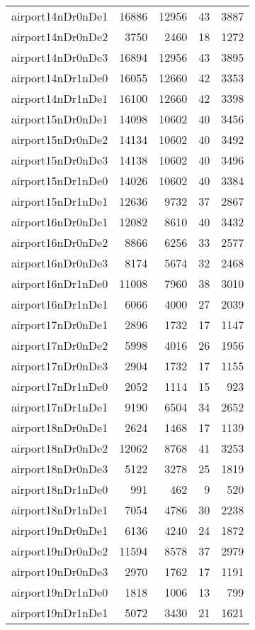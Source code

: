 \begin{longtable}{lrrrr}
airport14nDr0nDe1 & 16886 & 12956 & 43 & 3887 \\
airport14nDr0nDe2 & 3750 & 2460 & 18 & 1272 \\
airport14nDr0nDe3 & 16894 & 12956 & 43 & 3895 \\
airport14nDr1nDe0 & 16055 & 12660 & 42 & 3353 \\
airport14nDr1nDe1 & 16100 & 12660 & 42 & 3398 \\
airport15nDr0nDe1 & 14098 & 10602 & 40 & 3456 \\
airport15nDr0nDe2 & 14134 & 10602 & 40 & 3492 \\
airport15nDr0nDe3 & 14138 & 10602 & 40 & 3496 \\
airport15nDr1nDe0 & 14026 & 10602 & 40 & 3384 \\
airport15nDr1nDe1 & 12636 & 9732 & 37 & 2867 \\
airport16nDr0nDe1 & 12082 & 8610 & 40 & 3432 \\
airport16nDr0nDe2 & 8866 & 6256 & 33 & 2577 \\
airport16nDr0nDe3 & 8174 & 5674 & 32 & 2468 \\
airport16nDr1nDe0 & 11008 & 7960 & 38 & 3010 \\
airport16nDr1nDe1 & 6066 & 4000 & 27 & 2039 \\
airport17nDr0nDe1 & 2896 & 1732 & 17 & 1147 \\
airport17nDr0nDe2 & 5998 & 4016 & 26 & 1956 \\
airport17nDr0nDe3 & 2904 & 1732 & 17 & 1155 \\
airport17nDr1nDe0 & 2052 & 1114 & 15 & 923 \\
airport17nDr1nDe1 & 9190 & 6504 & 34 & 2652 \\
airport18nDr0nDe1 & 2624 & 1468 & 17 & 1139 \\
airport18nDr0nDe2 & 12062 & 8768 & 41 & 3253 \\
airport18nDr0nDe3 & 5122 & 3278 & 25 & 1819 \\
airport18nDr1nDe0 & 991 & 462 & 9 & 520 \\
airport18nDr1nDe1 & 7054 & 4786 & 30 & 2238 \\
airport19nDr0nDe1 & 6136 & 4240 & 24 & 1872 \\
airport19nDr0nDe2 & 11594 & 8578 & 37 & 2979 \\
airport19nDr0nDe3 & 2970 & 1762 & 17 & 1191 \\
airport19nDr1nDe0 & 1818 & 1006 & 13 & 799 \\
airport19nDr1nDe1 & 5072 & 3430 & 21 & 1621 \\

\end{longtable}
